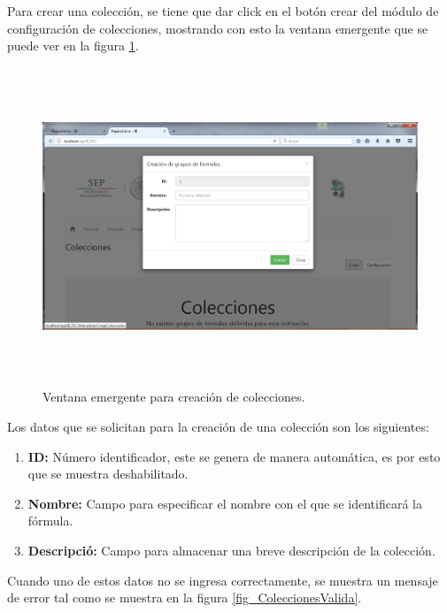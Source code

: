 			Para crear una colecci\'on, se tiene que dar click en el bot\'on crear del m\'odulo de configuraci\'on de colecciones, mostrando con esto la ventana emergente  que se puede ver en la figura \ref{fig_ColeccionesCrear}.\\

			\begin{figure}[]
		        \centering
		        \includegraphics[width=16cm, height=9.5cm]{figuras/ColeccionesCrear}
		        \caption{Ventana emergente para creaci\'on de colecciones.}
		        \label{fig_ColeccionesCrear}
		    \end{figure}
			
			Los datos que se solicitan para la creaci\'on de una colecci\'on son los siguientes:
			\begin{enumerate}[1.]
				\item \textbf{ID:} N\'umero identificador, este se genera de manera autom\'atica, es por esto que se muestra deshabilitado.
				\item \textbf{Nombre:} Campo para especificar el nombre con el que se identificar\'a la f\'ormula.
				\item \textbf{Descripci\'o:} Campo para almacenar una breve descripci\'on de la colecci\'on.
			\end{enumerate}

			Cuando uno de estos datos no se ingresa correctamente, se muestra un mensaje de error tal como se muestra en la figura \ref{fig_ColeccionesValida}.\\

